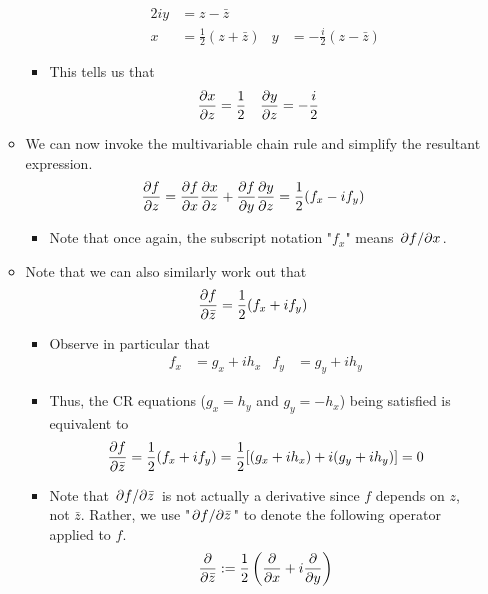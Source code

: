 \documentclass[../notes.tex]{subfiles}
\begin{document}
\begin{itemize}
\begin{itemize}
\begin{itemize}
\begin{align*}
                    2iy &= z-\bar{z}\\
                x &= \frac{1}{2}(z+\bar{z})&
                    y &= -\frac{i}{2}(z-\bar{z})
            \end{align*}
            \item This tells us that
            \begin{align*}
                \pdv{x}{z} &= \frac{1}{2}&
                \pdv{y}{z} &= -\frac{i}{2}
            \end{align*}
        \end{itemize}
        \item We can now invoke the multivariable chain rule and simplify the resultant expression.
        \begin{equation*}
            \pdv{f}{z} = \pdv{f}{x}\pdv{x}{z}+\pdv{f}{y}\pdv{y}{z}
            = \frac{1}{2}(f_x-if_y)
        \end{equation*}
        \begin{itemize}
            \item Note that once again, the subscript notation "$f_x$" means $\pdv*{f}{x}$.
        \end{itemize}
        \item Note that we can also similarly work out that
        \begin{equation*}
            \pdv{f}{\bar{z}} = \frac{1}{2}(f_x+if_y)
        \end{equation*}
        \begin{itemize}
            \item Observe in particular that
            \begin{align*}
                f_x &= g_x+ih_x&
                f_y &= g_y+ih_y
            \end{align*}
            \item Thus, the CR equations ($g_x=h_y$ and $g_y=-h_x$) being satisfied is equivalent to
            \begin{equation*}
                \pdv{f}{\bar{z}} = \frac{1}{2}(f_x+if_y)
                = \frac{1}{2}[(g_x+ih_x)+i(g_y+ih_y)]
                = 0
            \end{equation*}
            \item Note that $\pdv*{f}{\bar{z}}$ is not actually a derivative since $f$ depends on $z$, not $\bar{z}$. Rather, we use "$\pdv*{f}{\bar{z}}$" to denote the following operator applied to $f$.
            \begin{equation*}
                \pdv{\bar{z}} := \frac{1}{2}\left( \pdv{x}+i\pdv{y} \right)

\end{equation*}
\end{itemize}
\end{itemize}
\end{itemize}
\end{document}
